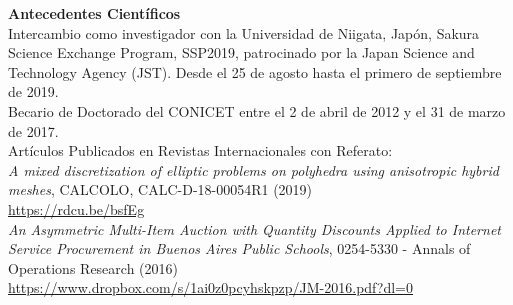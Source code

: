 \textbf{Antecedentes Cient\'ificos}\\[6pt]
Intercambio como investigador con la Universidad de Niigata, Jap\'on,
Sakura Science Exchange Program, SSP2019, patrocinado por
la Japan Science and Technology Agency (JST). Desde el 25 de agosto
hasta el primero de septiembre de 2019.\\[6pt]
Becario de Doctorado del CONICET entre el 2 de abril de 2012 y el 31 de marzo de 2017.\\[6pt]
Art\'iculos Publicados en Revistas Internacionales con Referato:\\[6pt]
\emph{A mixed discretization of elliptic problems on polyhedra using anisotropic hybrid meshes},
CALCOLO, CALC-D-18-00054R1 (2019)\\
\href{http://em.rdcu.be/wf/click?upn=lMZy1lernSJ7apc5DgYM8RtiRnX98cgbvE81KQGn5tE-3D_-2Fq09Vpjrycd-2BAOhvYDidHaHWLaG8WMoWs1lRs2mKTzqCwYNFhlGtplH8kb8yUCOrEFESCWAEP1qrD-2BJgg09nu-2Fz61XDXWYdppeXx4JzFRLvI-2FYyjZMrov-2FaxFxLv9MaqfC-2BjYanB-2FkLIArphbTB7hvuq-2BJ-2BP0dpoVrgh2NJYizQcMbyo6AA8jcx6RYsWvb3RMk9c7QXTqmoLaHKr8Xg6yK2lC1IxrYwuPPxXUxfxXQc0WAqTO-2Bg-2F9P-2BWkhJXyogoqkg5GNjl1KqQhJV5xi014g-3D-3D}{\color{blue}https://rdcu.be/bsfEg}
\\[4pt]
\emph{An Asymmetric Multi-Item Auction with Quantity Discounts Applied to Internet 
Service Procurement in Buenos Aires Public Schools}, 
0254-5330 - Annals of Operations Research (2016)\\
\href{https://www.dropbox.com/s/1ai0z0pcyhskpzp/JM-2016.pdf?dl=0}{\color{blue}https://www.dropbox.com/s/1ai0z0pcyhskpzp/JM-2016.pdf?dl=0}\\[6pt]

